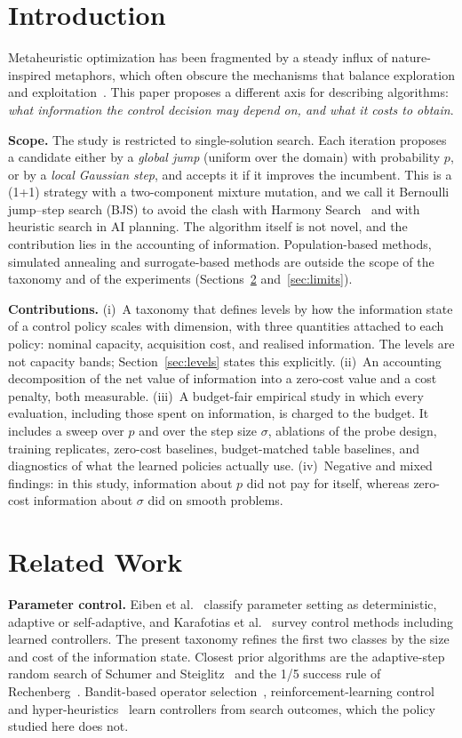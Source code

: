 \documentclass[conference]{IEEEtran}
\begin{document}
\section{Introduction}
Metaheuristic optimization has been fragmented by a steady influx of nature-inspired metaphors, which often obscure the mechanisms that balance exploration and exploitation~\cite{sorensen2015}. This paper proposes a different axis for describing algorithms: \emph{what information the control decision may depend on, and what it costs to obtain}.

\textbf{Scope.} The study is restricted to single-solution search. Each iteration proposes a candidate either by a \emph{global jump} (uniform over the domain) with probability $p$, or by a \emph{local Gaussian step}, and accepts it if it improves the incumbent. This is a (1+1) strategy with a two-component mixture mutation, and we call it Bernoulli jump--step search (BJS) to avoid the clash with Harmony Search~\cite{geem2001} and with heuristic search in AI planning. The algorithm itself is not novel, and the contribution lies in the accounting of information. Population-based methods, simulated annealing and surrogate-based methods are outside the scope of the taxonomy and of the experiments (Sections~\ref{sec:related} and~\ref{sec:limits}).

\textbf{Contributions.}
(i)~A taxonomy that defines levels by how the information state of a control policy scales with dimension, with three quantities attached to each policy: nominal capacity, acquisition cost, and realised information. The levels are not capacity bands; Section~\ref{sec:levels} states this explicitly.
(ii)~An accounting decomposition of the net value of information into a zero-cost value and a cost penalty, both measurable.
(iii)~A budget-fair empirical study in which every evaluation, including those spent on information, is charged to the budget. It includes a sweep over $p$ and over the step size $\sigma$, ablations of the probe design, training replicates, zero-cost baselines, budget-matched table baselines, and diagnostics of what the learned policies actually use.
(iv)~Negative and mixed findings: in this study, information about $p$ did not pay for itself, whereas zero-cost information about $\sigma$ did on smooth problems.

\section{Related Work}\label{sec:related}
\textbf{Parameter control.} Eiben et al.~\cite{eiben1999} classify parameter setting as deterministic, adaptive or self-adaptive, and Karafotias et al.~\cite{karafotias2015} survey control methods including learned controllers. The present taxonomy refines the first two classes by the size and cost of the information state. Closest prior algorithms are the adaptive-step random search of Schumer and Steiglitz~\cite{schumer1968} and the 1/5 success rule of Rechenberg~\cite{rechenberg1973}. Bandit-based operator selection~\cite{fialho2010}, reinforcement-learning control~\cite{sharma2019} and hyper-heuristics~\cite{burke2013} learn controllers from search outcomes, which the policy studied here does not.
\end{document}
